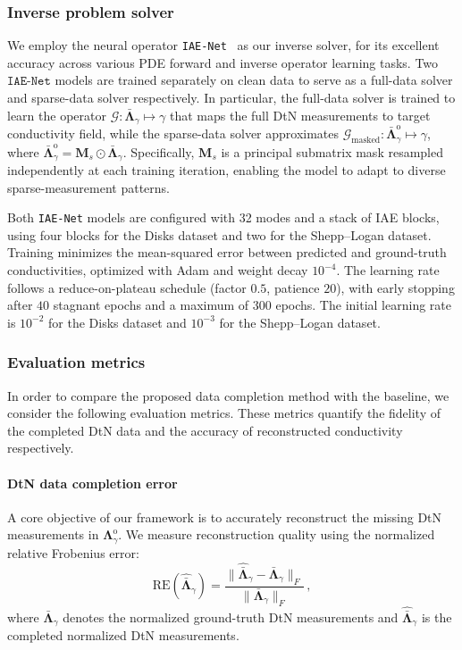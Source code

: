 \documentclass{article}
\begin{document}
\subsubsection{Inverse problem solver}  
We employ the neural operator \texttt{IAE-Net}~\citep{ong2022integral} as our inverse solver, for its excellent accuracy across various PDE forward and inverse operator learning tasks.
Two $\texttt{IAE-Net}$ models are trained separately on clean data to serve as a full-data solver and sparse-data solver respectively. 
In particular, the full-data solver is trained to learn the operator \(\mathcal{G}:\bar{\mathbf{\Lambda}}_\gamma \mapsto \gamma\) that maps the full DtN measurements to target conductivity field, while the sparse-data solver approximates \(\mathcal{G}_{\mathrm{masked}}: \bar{\mathbf{\Lambda}}_\gamma^{\text{o}} \mapsto \gamma\), where \(\bar{\mathbf{\Lambda}}_\gamma^{\text{o}} = \mathbf{M}_s \odot \bar{\mathbf{\Lambda}}_\gamma\). Specifically, $\mathbf{M}_s$ is a principal submatrix mask resampled independently at each training iteration, enabling the model to adapt to diverse sparse-measurement patterns. 

Both \texttt{IAE-Net} models are configured with 32 modes and a stack of IAE blocks, using four blocks for the Disks dataset and two for the Shepp--Logan dataset. Training minimizes the mean-squared error between predicted and ground-truth conductivities, optimized with Adam and weight decay $10^{-4}$. The learning rate follows a reduce-on-plateau schedule (factor $0.5$, patience $20$), with early stopping after $40$ stagnant epochs and a maximum of $300$ epochs. The initial learning rate is $10^{-2}$ for the Disks dataset and $10^{-3}$ for the Shepp--Logan dataset.

\subsubsection{Evaluation metrics}\label{sec:eval_metr}

In order to compare the proposed data completion method with the baseline, we consider the following evaluation metrics. These metrics quantify the fidelity of the completed DtN data and the accuracy of reconstructed conductivity respectively.

\paragraph{DtN data completion error}
A core objective of our framework is to accurately reconstruct the missing DtN measurements in $\mathbf{\Lambda}^{\text{o}}_\gamma$. We measure reconstruction quality using the normalized relative Frobenius error:
\begin{equation}
\label{eqn:dtn-error}
\text{RE}\left(\widehat{\bar{\mathbf{\Lambda}}}_\gamma\right) = \frac{\|\widehat{\bar{\mathbf{\Lambda}}}_\gamma  - \bar{\mathbf{\Lambda}}_\gamma \|_F}{\|\bar{\mathbf{\Lambda}}_\gamma \|_F}\,,
\end{equation}
where $\bar{\mathbf{\Lambda}}_\gamma$ denotes the normalized ground-truth DtN measurements and $\widehat{\bar{\mathbf{\Lambda}}}_\gamma$ is the completed normalized DtN measurements. 
\end{document}
